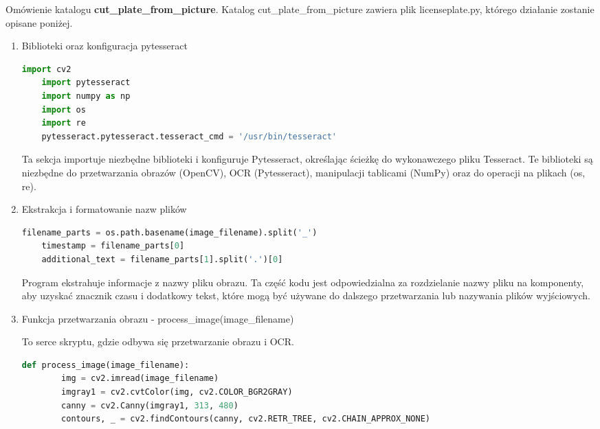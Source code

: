 \documentclass[12pt,a4paper,oneside]{article}
\theoremstyle{definition}
\numberwithin{equation}{section}
\begin{document}
Omówienie katalogu \textbf{cut{\_}plate{\_}from{\_}picture}. Katalog {cut{\_}plate{\_}from{\_}picture} zawiera plik licenseplate.py, którego działanie zostanie opisane poniżej.
\begin{enumerate}

\item Biblioteki oraz konfiguracja pytesseract 

\begin{adjustbox}{max width=\textwidth}
\begin{lstlisting}[language=Python]
    import cv2
    import pytesseract
    import numpy as np
    import os
    import re
    pytesseract.pytesseract.tesseract_cmd = '/usr/bin/tesseract'
\end{lstlisting}
\end{adjustbox}

 Ta sekcja importuje niezbędne biblioteki i konfiguruje Pytesseract, określając ścieżkę do wykonawczego pliku Tesseract. Te biblioteki są niezbędne do przetwarzania obrazów (OpenCV), OCR (Pytesseract), manipulacji tablicami (NumPy) oraz do operacji na plikach (os, re).


\item Ekstrakcja i formatowanie nazw plików

\begin{adjustbox}{max width=\textwidth}
\begin{lstlisting}[language=Python]
    filename_parts = os.path.basename(image_filename).split('_')
    timestamp = filename_parts[0]
    additional_text = filename_parts[1].split('.')[0]
\end{lstlisting} 
\end{adjustbox}

Program ekstrahuje informacje z nazwy pliku obrazu. Ta część kodu jest odpowiedzialna za rozdzielanie nazwy pliku na komponenty, aby uzyskać znacznik czasu i dodatkowy tekst, które mogą być używane do dalszego przetwarzania lub nazywania plików wyjściowych.


\item Funkcja przetwarzania obrazu - process{\_}image(image{\_}filename)


To serce skryptu, gdzie odbywa się przetwarzanie obrazu i OCR.

\begin{adjustbox}{max width=\textwidth}
\begin{lstlisting}[language=Python]
    def process_image(image_filename):
        img = cv2.imread(image_filename)
        imgray1 = cv2.cvtColor(img, cv2.COLOR_BGR2GRAY)
        canny = cv2.Canny(imgray1, 313, 480)
        contours, _ = cv2.findContours(canny, cv2.RETR_TREE, cv2.CHAIN_APPROX_NONE)
\end{lstlisting}
\end{adjustbox}


\end{enumerate}
\end{document}
